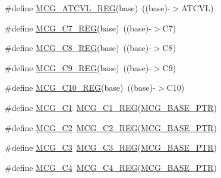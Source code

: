 \begin{DoxyCompactItemize}
\#define \hyperlink{group___m_c_g___register___accessor___macros_gae8da97d512d94aa7026889ca0aadedbf}{M\+C\+G\+\_\+\+A\+T\+C\+V\+L\+\_\+\+R\+EG}(base)~((base)-\/$>$A\+T\+C\+VL)
\item 
\#define \hyperlink{group___m_c_g___register___accessor___macros_ga539e138338d19786d39052d096896e96}{M\+C\+G\+\_\+\+C7\+\_\+\+R\+EG}(base)~((base)-\/$>$C7)
\item 
\#define \hyperlink{group___m_c_g___register___accessor___macros_ga9d7e2b88a408a722f0b7f64a7a32af01}{M\+C\+G\+\_\+\+C8\+\_\+\+R\+EG}(base)~((base)-\/$>$C8)
\item 
\#define \hyperlink{group___m_c_g___register___accessor___macros_ga4edaa0cc446f810f9aa01a41f6960573}{M\+C\+G\+\_\+\+C9\+\_\+\+R\+EG}(base)~((base)-\/$>$C9)
\item 
\#define \hyperlink{group___m_c_g___register___accessor___macros_gaf22ce39beaaebd71b3d675a11ed7fb0b}{M\+C\+G\+\_\+\+C10\+\_\+\+R\+EG}(base)~((base)-\/$>$C10)
\item 
\#define \hyperlink{group___m_c_g___register___accessor___macros_ga3f1a2c81a59d97251a06534341ad3303}{M\+C\+G\+\_\+\+C1}~\hyperlink{group___m_c_g___register___accessor___macros_ga8bae88afeec8abab181383a6e5a9fecb}{M\+C\+G\+\_\+\+C1\+\_\+\+R\+EG}(\hyperlink{group___m_c_g___peripheral_gaceefc72e93a47a35f59a31c57dddf41b}{M\+C\+G\+\_\+\+B\+A\+S\+E\+\_\+\+P\+TR})
\item 
\#define \hyperlink{group___m_c_g___register___accessor___macros_gabaeaf7dd44e609a83f01b9fec0dec0c3}{M\+C\+G\+\_\+\+C2}~\hyperlink{group___m_c_g___register___accessor___macros_ga1fe49262912ac579f147ae5c2cfde5a5}{M\+C\+G\+\_\+\+C2\+\_\+\+R\+EG}(\hyperlink{group___m_c_g___peripheral_gaceefc72e93a47a35f59a31c57dddf41b}{M\+C\+G\+\_\+\+B\+A\+S\+E\+\_\+\+P\+TR})
\item 
\#define \hyperlink{group___m_c_g___register___accessor___macros_gaea76a22acf5112243d988d5d73c5a459}{M\+C\+G\+\_\+\+C3}~\hyperlink{group___m_c_g___register___accessor___macros_ga7ead9604d56b0f9d04a297a8ddad2bfd}{M\+C\+G\+\_\+\+C3\+\_\+\+R\+EG}(\hyperlink{group___m_c_g___peripheral_gaceefc72e93a47a35f59a31c57dddf41b}{M\+C\+G\+\_\+\+B\+A\+S\+E\+\_\+\+P\+TR})
\item 
\#define \hyperlink{group___m_c_g___register___accessor___macros_ga38959856c816b6ac3eaa205b8975690e}{M\+C\+G\+\_\+\+C4}~\hyperlink{group___m_c_g___register___accessor___macros_ga7ecd15c7ea67a8febfe9fb84044905c8}{M\+C\+G\+\_\+\+C4\+\_\+\+R\+EG}(\hyperlink{group___m_c_g___peripheral_gaceefc72e93a47a35f59a31c57dddf41b}{M\+C\+G\+\_\+\+B\+A\+S\+E\+\_\+\+P\+TR})

\end{DoxyCompactItemize}
